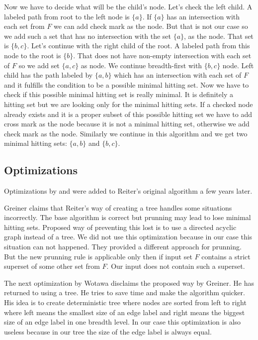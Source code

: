 \documentclass[12pt,a4paper]{article}
\begin{document}
Now we have to decide what will be the child's node. Let's check the left child. A labeled path from root to the left node is $\{a\}$. If $\{a\}$ has an intersection with each set from $F$ we can add check mark as the node. But that is not our case so we add such a set that has no intersection with the set $\{ a \}$, as the node. That set is $\{b,c\}$. Let's continue with the right child of the root. A labeled path from this node to the root is $\{b\}$. That does not have non-empty intersection with each set of $F$ so we add set $\{ a,c \}$ as node. We continue breadth-first with $\{b,c\}$ node. Left child has the path labeled by $\{a,b\}$ which has an intersection with each set of $F$ and it fulfills the condition to be a possible minimal hitting set. Now we have to check if this possible minimal hitting set is really minimal. It is definitely a hitting set but we are looking only for the minimal hitting sets. If a checked node already exists and it is a proper subset of this possible hitting set we have to add cross mark as the node because it is not a minimal hitting set, otherwise we add check mark as the node. Similarly we continue in this algorithm and we get two minimal hitting sets: $\{a,b\}$ and $\{b,c\}$.

\subsection{Optimizations}
Optimizations by \cite{greinerReitersCorrection} and \cite{wotawaReitersVariant} were added to Reiter's original algorithm a few years later. 

Greiner claims that Reiter's way of creating a tree handles some situations incorrectly. The base algorithm is correct but prunning may lead to lose minimal hitting sets. Proposed way of preventing this lost is to use a directed acyclic graph instead of a tree. We did not use this optimization because in our case this situation can not happened. They provided a different approach for prunning. But the new prunning rule is applicable only then if input set $F$ contains a strict superset of some other set from $F$. Our input does not contain such a superset.

The next optimization by Wotawa disclaims the proposed way by Greiner. He has returned to using a tree. He tries to save time and make the algorithm quicker. His idea is to create deterministic tree where nodes are sorted from left to right where left means the smallest size of an edge label and right means the biggest size of an edge label in one breadth level. In our case this optimization is also useless because in our tree the size of the edge label is always equal.
\end{document}

